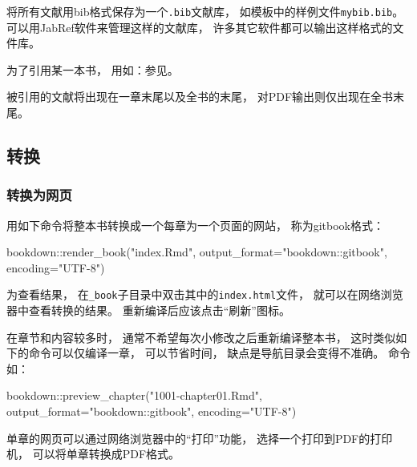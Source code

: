 \documentclass[
]{article}
\newenvironment{Shaded}{\begin{snugshade}}{\end{snugshade}}
\newcommand{\AttributeTok}[1]{\textcolor[rgb]{0.77,0.63,0.00}{#1}}
\newcommand{\FunctionTok}[1]{\textcolor[rgb]{0.00,0.00,0.00}{#1}}
\newcommand{\NormalTok}[1]{#1}
\newcommand{\SpecialCharTok}[1]{\textcolor[rgb]{0.00,0.00,0.00}{#1}}
\newcommand{\StringTok}[1]{\textcolor[rgb]{0.31,0.60,0.02}{#1}}
\begin{document}
将所有文献用bib格式保存为一个\texttt{.bib}文献库，
如模板中的样例文件\texttt{mybib.bib}。
可以用JabRef软件来管理这样的文献库，
许多其它软件都可以输出这样格式的文件库。

为了引用某一本书，
用如：参见\autocite{Wichmann1982:RNG}。

被引用的文献将出现在一章末尾以及全书的末尾，
对PDF输出则仅出现在全书末尾。

\hypertarget{usage-output}{%
\subsection{转换}\label{usage-output}}

\hypertarget{usage-gitbook}{%
\subsubsection{转换为网页}\label{usage-gitbook}}

用如下命令将整本书转换成一个每章为一个页面的网站，
称为gitbook格式：

\begin{Shaded}
\begin{Highlighting}[]
\NormalTok{bookdown}\SpecialCharTok{::}\FunctionTok{render\_book}\NormalTok{(}\StringTok{"index.Rmd"}\NormalTok{, }
  \AttributeTok{output\_format=}\StringTok{"bookdown::gitbook"}\NormalTok{, }\AttributeTok{encoding=}\StringTok{"UTF{-}8"}\NormalTok{)}
\end{Highlighting}
\end{Shaded}

为查看结果，
在\texttt{\_book}子目录中双击其中的\texttt{index.html}文件，
就可以在网络浏览器中查看转换的结果。
重新编译后应该点击``刷新''图标。

在章节和内容较多时，
通常不希望每次小修改之后重新编译整本书，
这时类似如下的命令可以仅编译一章，
可以节省时间，
缺点是导航目录会变得不准确。
命令如：

\begin{Shaded}
\begin{Highlighting}[]
\NormalTok{bookdown}\SpecialCharTok{::}\FunctionTok{preview\_chapter}\NormalTok{(}\StringTok{"1001{-}chapter01.Rmd"}\NormalTok{,}
  \AttributeTok{output\_format=}\StringTok{"bookdown::gitbook"}\NormalTok{, }\AttributeTok{encoding=}\StringTok{"UTF{-}8"}\NormalTok{)}
\end{Highlighting}
\end{Shaded}

单章的网页可以通过网络浏览器中的``打印''功能，
选择一个打印到PDF的打印机，
可以将单章转换成PDF格式。
\end{document}

